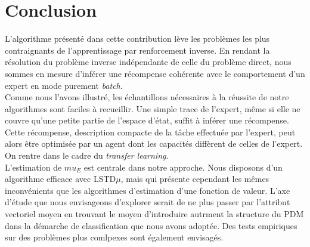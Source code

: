 \documentclass{article}
\begin{document}
\section{Conclusion}

L'algorithme présenté dans cette contribution lève les problèmes les plus contraignants de l'apprentissage par renforcement inverse. En rendant la résolution du problème inverse indépendante de celle du problème direct, nous sommes en mesure d'inférer une récompense cohérente avec le comportement d'un expert en mode purement \emph{batch}.\\

Comme nous l'avons illustré, les échantillons nécessaires à la réussite de notre algorithmes sont faciles à recueillir. Une simple trace de l'expert, même si elle ne couvre qu'une petite partie de l'espace d'état, suffit à inférer une récompense. Cette récompense, description compacte de la tâche effectuée par l'expert, peut alors être optimisée par un agent dont les capacités diffèrent de celles de l'expert. On rentre dans le cadre du \emph{transfer learning}.\\

L'estimation de $mu_E$ est centrale dans notre approche. Nous disposons d'un algorithme efficace avec LSTD$\mu$, mais qui présente cependant les mêmes inconvénients que les algorithmes d'estimation d'une fonction de valeur. L'axe d'étude que nous envisageons d'explorer serait de ne plus passer par l'attribut vectoriel moyen en trouvant le moyen d'introduire autrment la structure du PDM dans la démarche de classification que nous avons adoptée. Des tests empiriques sur des problèmes plus comlpexes sont également envisagés.
%
%


\end{document}
